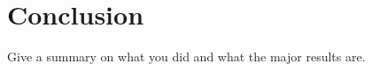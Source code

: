 
\chapter{Conclusion}
\label{sec:conclusion}

Give a summary on what you did and what the major results are.